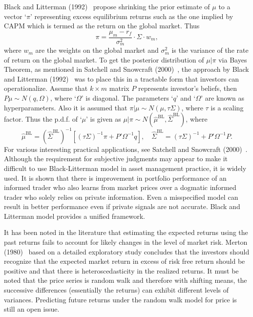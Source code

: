 Black and Litterman (1992)~\cite{blacklit} propose shrinking the prior estimate of $\mu$ to a vector `$\pi$' representing excess equilibrium returns such as the one implied by CAPM which is termed as the return on the global market. Thus
	\begin{equation} \label{eqn:bigpi}
	\pi = \dfrac{\mu_m-r_f}{\sigma_m^2} \cdot \Sigma \cdot w_m,
	\end{equation}
where $w_m$ are the weights on the global market and $\sigma_m^2$ is the variance of the rate of return on the global market. To get the posterior distribution of $\mu \big| \pi$ via Bayes Theorem, as mentioned in Satchell and Snowcraft (2000)~\cite{snow}, the approach by Black and Litterman (1992)~\cite{blacklit}  was to place this in a tractable form that investors can operationalize. Assume that $k \times m$ matrix $P$ represents investor's beliefs, then $P \mu \sim N(q,\Omega)$, where `$\Omega$' is diagonal. The parameters `$q$' and `$\Omega$' are known as hyperparameters. Also it is assumed that $\pi \big| \mu \sim N(\mu,\tau \Sigma)$, where $\tau$ is a scaling factor. Thus the p.d.f. of `$\mu$' is given as $\mu \big| \pi \sim N(\hat{\mu}^{\text{BL}}, \hat{\Sigma}^{\text{BL}})$, where 
	\begin{equation} \label{eqn:bleq}
	\hat{\mu}^{\text{BL}}= (\hat{\Sigma}^{\text{BL}})^{-1} [ (\tau \Sigma)^{-1}\pi + P' \Omega^{-1}q], \quad \hat{\Sigma}^{\text{BL}}= (\tau \Sigma)^{-1} + P' \Omega^{-1}P.
	\end{equation}
For various interesting practical applications, see Satchell and Snowcraft (2000)~\cite{snow}. Although the requirement for subjective judgments may appear to make it difficult to use Black-Litterman model in asset management practice, it is widely used. It is shown that there is improvement in portfolio performance of an informed trader who also learns from market prices over a dogmatic informed trader who solely relies on private information. Even a misspecified model can result in better performance even if private signals are not accurate. Black and Litterman model provides a unified framework.


It has been noted in the literature that estimating the expected returns using the past returns fails to account for likely changes in the level of market risk. Merton (1980)~\cite{merton} based on a detailed exploratory study concludes that the investors should recognize that the expected market return in excess of risk free return should be positive and that there is heteroscedasticity in the realized returns. It must be noted that the price series is random walk and therefore with shifting means, the successive differences (essentially the returns) can exhibit different levels of variances. Predicting future returns under the random walk model for price is still an open issue.


